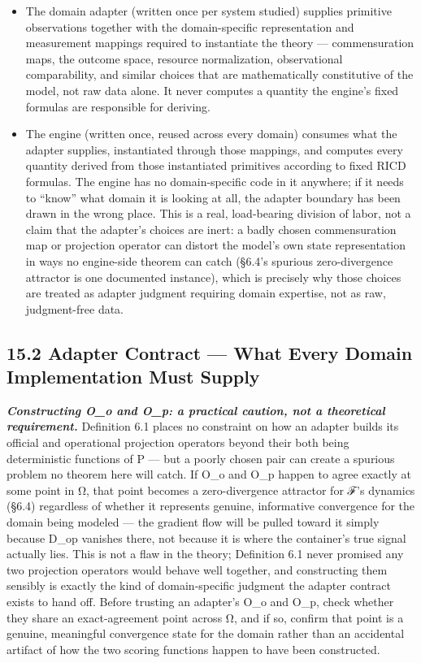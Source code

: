 \documentclass[
]{article}
\begin{document}
\begin{itemize}
\item
  The domain adapter (written once per system studied) supplies
  primitive observations together with the domain-specific
  representation and measurement mappings required to instantiate the
  theory --- commensuration maps, the outcome space, resource
  normalization, observational comparability, and similar choices that
  are mathematically constitutive of the model, not raw data alone. It
  never computes a quantity the engine's fixed formulas are responsible
  for deriving.
\item
  The engine (written once, reused across every domain) consumes what
  the adapter supplies, instantiated through those mappings, and
  computes every quantity derived from those instantiated primitives
  according to fixed RICD formulas. The engine has no domain-specific
  code in it anywhere; if it needs to ``know'' what domain it is looking
  at all, the adapter boundary has been drawn in the wrong place. This
  is a real, load-bearing division of labor, not a claim that the
  adapter's choices are inert: a badly chosen commensuration map or
  projection operator can distort the model's own state representation
  in ways no engine-side theorem can catch (§6.4's spurious
  zero-divergence attractor is one documented instance), which is
  precisely why those choices are treated as adapter judgment requiring
  domain expertise, not as raw, judgment-free data.
\end{itemize}

\hypertarget{adapter-contract-what-every-domain-implementation-must-supply}{%
\subsection{15.2 Adapter Contract --- What Every Domain Implementation
Must
Supply}\label{adapter-contract-what-every-domain-implementation-must-supply}}

\emph{\textbf{Constructing O\_o and O\_p: a practical caution, not a
theoretical requirement.}} Definition 6.1 places no constraint on how an
adapter builds its official and operational projection operators beyond
their both being deterministic functions of P --- but a poorly chosen
pair can create a spurious problem no theorem here will catch. If O\_o
and O\_p happen to agree exactly at some point in Ω, that point becomes
a zero-divergence attractor for ℱ's dynamics (§6.4) regardless of
whether it represents genuine, informative convergence for the domain
being modeled --- the gradient flow will be pulled toward it simply
because D\_op vanishes there, not because it is where the container's
true signal actually lies. This is not a flaw in the theory; Definition
6.1 never promised any two projection operators would behave well
together, and constructing them sensibly is exactly the kind of
domain-specific judgment the adapter contract exists to hand off. Before
trusting an adapter's O\_o and O\_p, check whether they share an
exact-agreement point across Ω, and if so, confirm that point is a
genuine, meaningful convergence state for the domain rather than an
accidental artifact of how the two scoring functions happen to have been
constructed.
\end{document}

